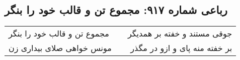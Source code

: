 \begin{center}
\section*{رباعی شماره ۹۱۷: مجموع تن و قالب خود را بنگر}
\label{sec:0917}
\begin{longtable}{l p{0.5cm} r}
مجموع تن و قالب خود را بنگر
&&
جوقی مستند و خفته بر همدیگر
\\
مونس خواهی صلای بیداری زن
&&
بر خفته منه پای و ازو در مگذر
\\
\end{longtable}
\end{center}
